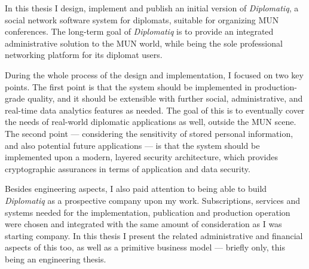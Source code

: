 In this thesis I design, implement and publish an initial version of \emph{Diplomatiq}, a social network software system for diplomats, suitable for organizing MUN conferences. The long-term goal of \emph{Diplomatiq} is to provide an integrated administrative solution to the MUN world, while being the sole professional networking platform for its diplomat users.

During the whole process of the design and implementation, I focused on two key points. The first point is that the system should be implemented in production-grade quality, and it should be extensible with further social, administrative, and real-time data analytics features as needed. The goal of this is to eventually cover the needs of real-world diplomatic applications as well, outside the MUN scene. The second point — considering the sensitivity of stored personal information, and also potential future applications — is that the system should be implemented upon a modern, layered security architecture, which provides cryptographic assurances in terms of application and data security.

Besides engineering aspects, I also paid attention to being able to build \emph{Diplomatiq} as a prospective company upon my work. Subscriptions, services and systems needed for the implementation, publication and production operation were chosen and integrated with the same amount of consideration as I was starting company. In this thesis I present the related administrative and financial aspects of this too, as well as a primitive business model — briefly only, this being an engineering thesis.

